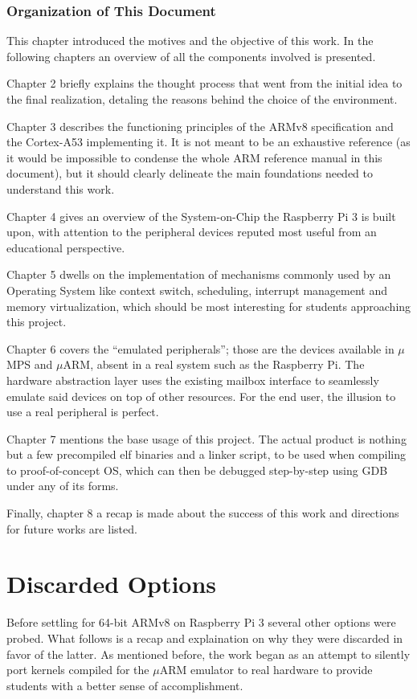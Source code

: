 \documentclass[12pt,a4paper,openright,twoside]{report}
\begin{document}
\subsection{Organization of This Document}
This chapter introduced the motives and the objective of this work. In the following
chapters an overview of all the components involved is presented.

Chapter 2 briefly explains the thought process that went from the initial idea
to the final realization, detaling the reasons behind the choice of the environment.

Chapter 3 describes the functioning principles of the ARMv8 specification and
 the Cortex-A53 implementing it. It is not meant to be an exhaustive reference 
 (as it would be impossible to condense the whole ARM reference manual in this
 document), but it should clearly delineate the main foundations needed to 
 understand this work.

Chapter 4 gives an overview of the System-on-Chip the Raspberry Pi 3 is built
upon, with attention to the peripheral devices reputed most useful from an 
educational perspective.

Chapter 5 dwells on the implementation of mechanisms commonly used by an Operating
System like context switch, scheduling, interrupt management and memory virtualization,
which should be most interesting for students approaching this project.

Chapter 6 covers the ``emulated peripherals''; those are the devices available in 
$\mu$MPS and $\mu$ARM, absent in a real system such as the Raspberry Pi. The hardware
abstraction layer uses the existing mailbox interface to seamlessly emulate said
devices on top of other resources. For the end user, the illusion to use a real
peripheral is perfect.

Chapter 7 mentions the base usage of this project. The actual product is nothing
but a few precompiled elf binaries and a linker script, to be used when compiling
to proof-of-concept OS, which can then be debugged step-by-step using GDB under
any of its forms.

Finally, chapter 8 a recap is made about the success of this work and directions
for future works are listed.

\clearpage{\pagestyle{empty}\cleardoublepage}
\chapter{Discarded Options}
Before settling for 64-bit ARMv8 on Raspberry Pi 3 several other options were 
probed. What follows is a recap and explaination on why they were discarded
in favor of the latter. As mentioned before, the work began as an attempt to
silently port kernels compiled for the $\mu$ARM emulator to real hardware to 
provide students with a better sense of accomplishment.
\end{document}
